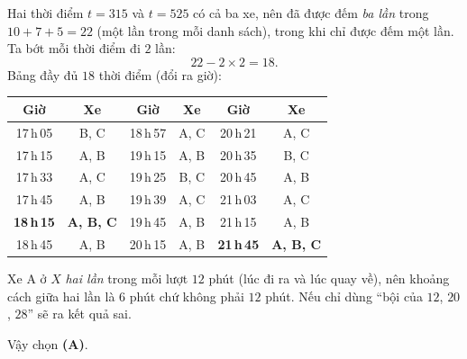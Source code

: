 {
Hai thời điểm $t=315$ và $t=525$ có cả ba xe, nên đã được đếm \emph{ba lần} trong $10+7+5=22$ (một lần trong mỗi danh sách), trong khi chỉ được đếm một lần. Ta bớt mỗi thời điểm đi $2$ lần:
\[ 22-2\times 2=18. \]
Bảng đầy đủ $18$ thời điểm (đổi ra giờ):
\begin{center}\small
\begin{tabular}{|c|c||c|c||c|c|}
\hline
\rowcolor{tmBlue!10}Giờ & Xe & Giờ & Xe & Giờ & Xe\\ \hline
17\,h\,05 & B, C & 18\,h\,57 & A, C & 20\,h\,21 & A, C\\ \hline
17\,h\,15 & A, B & 19\,h\,15 & A, B & 20\,h\,35 & B, C\\ \hline
17\,h\,33 & A, C & 19\,h\,25 & B, C & 20\,h\,45 & A, B\\ \hline
17\,h\,45 & A, B & 19\,h\,39 & A, C & 21\,h\,03 & A, C\\ \hline
\textbf{18\,h\,15} & \textbf{A, B, C} & 19\,h\,45 & A, B & 21\,h\,15 & A, B\\ \hline
18\,h\,45 & A, B & 20\,h\,15 & A, B & \textbf{21\,h\,45} & \textbf{A, B, C}\\ \hline
\end{tabular}
\end{center}
\begin{warnbox}Xe A ở $X$ \emph{hai lần} trong mỗi lượt $12$ phút (lúc đi ra và lúc quay về), nên khoảng cách giữa hai lần là $6$ phút chứ không phải $12$ phút. Nếu chỉ dùng ``bội của $12$, $20$, $28$'' sẽ ra kết quả sai.\end{warnbox}
Vậy chọn \textbf{(A)}.
}

